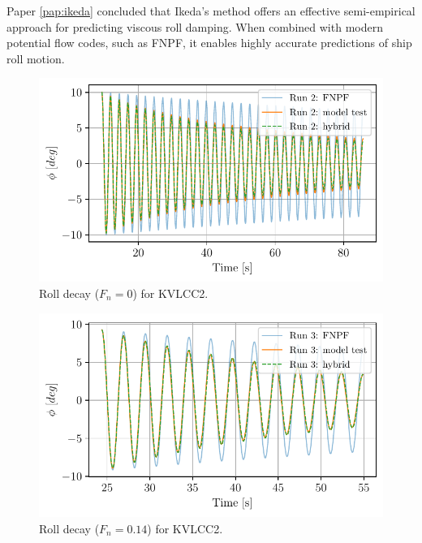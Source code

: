 Paper \ref{pap:ikeda} concluded that Ikeda's method offers an effective semi-empirical approach for predicting viscous roll damping. When combined with modern potential flow codes, such as FNPF, it enables highly accurate predictions of ship roll motion. 
\begin{figure}[h]
\center
\includegraphics[width=\textwidth]{figures/hybrid_0_time.pdf}
\caption{Roll decay ($F_n=0$) for KVLCC2.}
\label{fig:hybrid_0_time}
\end{figure}
\begin{figure}[h]
\center
\includegraphics[width=\textwidth]{figures/hybrid_speed_time.pdf}
\caption{Roll decay ($F_n=0.14$) for KVLCC2.}
\label{fig:hybrid_speed_time}
\end{figure}